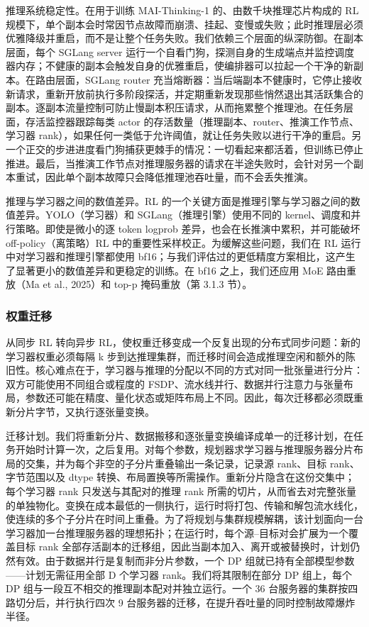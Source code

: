 \documentclass[
  10
]{article}
\begin{document}
推理系统稳定性。在用于训练 MAI-Thinking-1 的、由数千块推理芯片构成的 RL 规模下，单个副本会时常因节点故障而崩溃、挂起、变慢或失败；此时推理层必须优雅降级并重启，而不是让整个任务失败。我们依赖三个层面的纵深防御。在副本层面，每个 SGLang server 运行一个自看门狗，探测自身的生成端点并监控调度器内存；不健康的副本会触发自身的优雅重启，使编排器可以拉起一个干净的新副本。在路由层面，SGLang router 充当熔断器：当后端副本不健康时，它停止接收新请求，重新开放前执行多阶段探活，并定期重新发现那些悄然退出其活跃集合的副本。逐副本流量控制可防止慢副本积压请求，从而拖累整个推理池。在任务层面，存活监控器跟踪每类 actor 的存活数量（推理副本、router、推演工作节点、学习器 rank），如果任何一类低于允许阈值，就让任务失败以进行干净的重启。另一个正交的步进进度看门狗捕获更棘手的情况：一切看起来都活着，但训练已停止推进。最后，当推演工作节点对推理服务器的请求在半途失败时，会针对另一个副本重试，因此单个副本故障只会降低推理池吞吐量，而不会丢失推演。

推理与学习器之间的数值差异。RL 的一个关键方面是推理引擎与学习器之间的数值差异。YOLO（学习器）和 SGLang（推理引擎）使用不同的 kernel、调度和并行策略。即使是微小的逐 token logprob 差异，也会在长推演中累积，并可能破坏 off-policy（离策略）RL 中的重要性采样校正。为缓解这些问题，我们在 RL 运行中对学习器和推理引擎都使用 bf16；与我们评估过的更低精度方案相比，这产生了显著更小的数值差异和更稳定的训练。在 bf16 之上，我们还应用 MoE 路由重放（Ma et al., 2025）和 top-p 掩码重放（第 3.1.3 节）。

\subsubsection{权重迁移}\label{weight-transfer}

从同步 RL 转向异步 RL，使权重迁移变成一个反复出现的分布式同步问题：新的学习器权重必须每隔 k 步到达推理集群，而迁移时间会造成推理空闲和额外的陈旧性。核心难点在于，学习器与推理的分配以不同的方式对同一批张量进行分片：双方可能使用不同组合或程度的 FSDP、流水线并行、数据并行注意力与张量布局，参数还可能在精度、量化状态或矩阵布局上不同。因此，每次迁移都必须既重新分片字节，又执行逐张量变换。

迁移计划。我们将重新分片、数据搬移和逐张量变换编译成单一的迁移计划，在任务开始时计算一次，之后复用。对每个参数，规划器求学习器与推理服务器分片布局的交集，并为每个非空的子分片重叠输出一条记录，记录源 rank、目标 rank、字节范围以及 dtype 转换、布局置换等所需操作。重新分片隐含在这份交集中；每个学习器 rank 只发送与其配对的推理 rank 所需的切片，从而省去对完整张量的单独物化。变换在成本最低的一侧执行，运行时将打包、传输和解包流水线化，使连续的多个子分片在时间上重叠。为了将规划与集群规模解耦，该计划面向一台学习器加一台推理服务器的理想拓扑；在运行时，每个源--目标对会扩展为一个覆盖目标 rank 全部存活副本的迁移组，因此当副本加入、离开或被替换时，计划仍然有效。由于数据并行是复制而非分片参数，一个 DP 组就已持有全部模型参数——计划无需征用全部 D 个学习器 rank。我们将其限制在部分 DP 组上，每个 DP 组与一段互不相交的推理副本配对并独立运行。一个 36 台服务器的集群按四路切分后，并行执行四次 9 台服务器的迁移，在提升吞吐量的同时控制故障爆炸半径。
\end{document}
